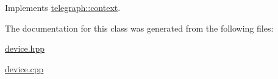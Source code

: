 Implements \hyperlink{classtelegraph_1_1context_a6765d7fa22fe99b9a6723c511396b781}{telegraph\+::context}.



The documentation for this class was generated from the following files\+:\begin{DoxyCompactItemize}
\item 
\hyperlink{device_8hpp}{device.\+hpp}\item 
\hyperlink{device_8cpp}{device.\+cpp}\end{DoxyCompactItemize}
